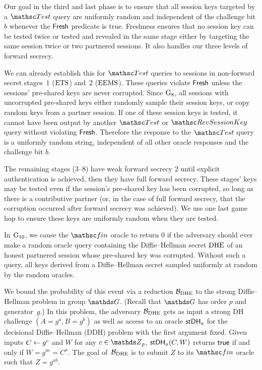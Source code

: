Our goal in the third and last phase is to ensure that all session keys targeted by a $\Test$ query are uniformly random and independent of the challenge bit $b$ whenever the $\mathsf{Fresh}$ predicate is true.
Freshness ensures that no session key can be tested twice or tested and revealed in the same stage either by targeting the same session twice or two partnered sessions.
It also handles our three levels of forward secrecy.

We can already establish this for $\Test$ queries to sessions in non-forward secret stages~$1$ ($\mathrm{ETS}$) and~$2$ ($\mathrm{EEMS}$).
These queries violate $\mathsf{Fresh}$ unless the sessions' pre-shared keys are never corrupted. 
Since $\textnormal{G}_8$, all sessions with uncorrupted pre-shared keys either randomly sample their session keys, or copy random keys from a partner session.
If one of these session keys is tested, it cannot have been output by another $\Test$ or $\RevSessionKey$ query without violating $\mathsf{Fresh}$.
Therefore the response to the $\Test$ query is a uniformly random string, independent of all other oracle responses and the challenge bit $b$.

The remaining stages ($3$--$8$) have weak forward secrecy $2$ until explicit authentication is achieved, then they have full forward secrecy.
These stages' keys may be tested even if the session's pre-shared key has been corrupted, so long as there is a contributive partner (or, in the case of full forward secrecy, that the corruption occurred after forward secrecy was achieved).
We use one last game hop to ensure these keys are uniformly random when they are tested.

In $\textnormal{G}_{10}$, we cause the $\Finalize$ oracle to return $0$ if the adversary should ever make a random oracle query containing the Diffie--Hellman secret $\mathrm{DHE}$ of an honest partnered session whose pre-shared key was corrupted.
Without such a query, all keys derived from a Diffie--Hellman secret sampled uniformly at random by the random oracles.

We bound the probability of this event via a reduction $\mathcal{B}_{\mathrm{DHE}}$ to the strong Diffie--Hellman problem in group $\G$.
(Recall that $\G$ has order $p$ and generator~$g$.)
In this problem, the adversary $\mathcal{B}_{\mathrm{DHE}}$ gets as input a strong DH challenge $(A = g^a, B = g^b)$ as well as access to an oracle $\mathsf{stDH}_a$ for the decisional Diffie--Hellman (DDH) problem with the first argument fixed. 
Given inputs $C \gets g^c$ and $W$ for any $c \in \Z_p$, $\mathsf{stDH}_a(C, W)$ returns $\mathsf{true}$ if and only if $W = g^{ac} = C^a$.
The goal of~$\mathcal{B}_{\mathrm{DHE}}$ is to submit $Z$ to its $\Finalize$ oracle such that $Z = g^{ab}$.

